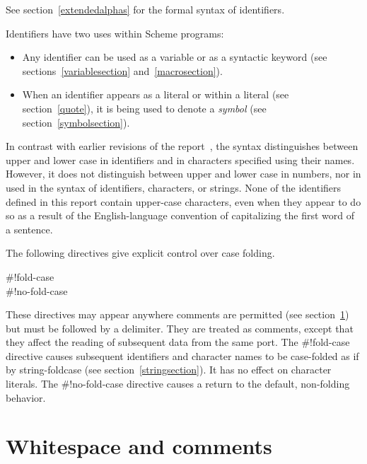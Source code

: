 See section~\ref{extendedalphas} for the formal syntax of identifiers.

\vest Identifiers have two uses within Scheme programs:
\begin{itemize}
\item Any identifier can be used as a variable
 or as a syntactic keyword
(see sections~\ref{variablesection} and~\ref{macrosection}).

\item When an identifier appears as a literal or within a literal
(see section~\ref{quote}), it is being used to denote a {\em symbol}
(see section~\ref{symbolsection}).
\end{itemize}

In contrast with earlier revisions of the report~\cite{R5RS}, the
syntax distinguishes between upper and lower case in
identifiers and in characters specified using their names.  However, it
does not distinguish between upper and lower case in numbers,
nor in  used
in the syntax of identifiers, characters, or strings.
None of the identifiers defined in this report contain upper-case
characters, even when they appear to do so as a result
of the English-language convention of capitalizing the first word of
a sentence.

The following directives give explicit control over case
folding.

\begin{entry}{%
{\cf{}\#!fold-case}\\
{\cf{}\#!no-fold-case}}

These directives may appear anywhere comments are permitted (see
section~\ref{wscommentsection}) but must be followed by a delimiter.
They are treated as comments, except that they affect the reading
of subsequent data from the same port. The {\cf{}\#!fold-case} directive causes
subsequent identifiers and character names to be case-folded
as if by {\cf string-foldcase} (see section~\ref{stringsection}).
It has no effect on character
literals.  The {\cf{}\#!no-fold-case} directive
causes a return to the default, non-folding behavior.
\end{entry}



\section{Whitespace and comments}
\label{wscommentsection}

